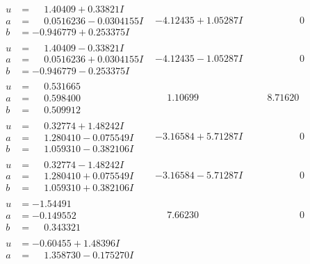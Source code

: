 \documentclass[1p]{elsarticle_modified}
\theoremstyle{definition}
\begin{document}
$$\begin{array}{c|c|c}
\begin{aligned}
u &= \phantom{-}1.40409 + 0.33821 I \\
a &= \phantom{-}0.0516236 - 0.0304155 I \\
b &= -0.946779 + 0.253375 I\end{aligned}
 & -4.12435 + 1.05287 I & \phantom{-0.000000 } 0 \\ \hline\begin{aligned}
u &= \phantom{-}1.40409 - 0.33821 I \\
a &= \phantom{-}0.0516236 + 0.0304155 I \\
b &= -0.946779 - 0.253375 I\end{aligned}
 & -4.12435 - 1.05287 I & \phantom{-0.000000 } 0 \\ \hline\begin{aligned}
u &= \phantom{-}0.531665\phantom{ +0.000000I} \\
a &= \phantom{-}0.598400\phantom{ +0.000000I} \\
b &= \phantom{-}0.509912\phantom{ +0.000000I}\end{aligned}
 & \phantom{-}1.10699\phantom{ +0.000000I} & \phantom{-}8.71620\phantom{ +0.000000I} \\ \hline\begin{aligned}
u &= \phantom{-}0.32774 + 1.48242 I \\
a &= \phantom{-}1.280410 - 0.075549 I \\
b &= \phantom{-}1.059310 - 0.382106 I\end{aligned}
 & -3.16584 + 5.71287 I & \phantom{-0.000000 } 0 \\ \hline\begin{aligned}
u &= \phantom{-}0.32774 - 1.48242 I \\
a &= \phantom{-}1.280410 + 0.075549 I \\
b &= \phantom{-}1.059310 + 0.382106 I\end{aligned}
 & -3.16584 - 5.71287 I & \phantom{-0.000000 } 0 \\ \hline\begin{aligned}
u &= -1.54491\phantom{ +0.000000I} \\
a &= -0.149552\phantom{ +0.000000I} \\
b &= \phantom{-}0.343321\phantom{ +0.000000I}\end{aligned}
 & \phantom{-}7.66230\phantom{ +0.000000I} & \phantom{-0.000000 } 0 \\ \hline\begin{aligned}
u &= -0.60455 + 1.48396 I \\
a &= \phantom{-}1.358730 - 0.175270 I \\

\end{aligned}
\end{array}$$
\end{document}
